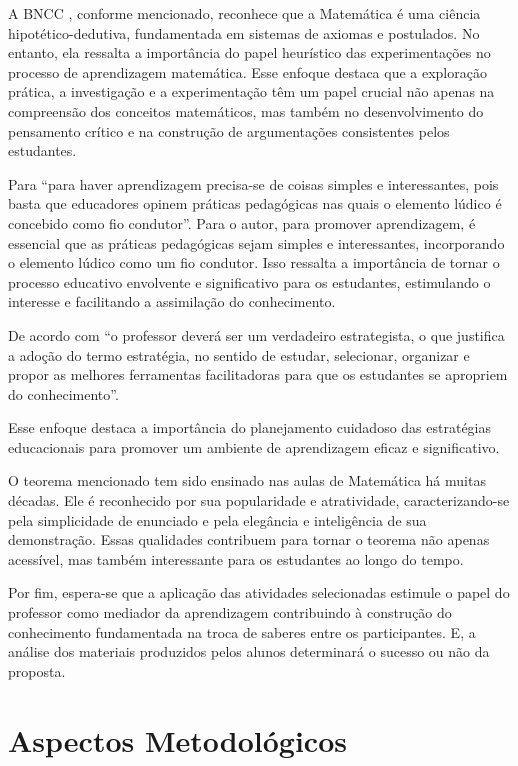 A BNCC \cite{Educacao2018}, conforme mencionado, reconhece que a Matemática é uma ciência hipotético-dedutiva, fundamentada em sistemas de axiomas e postulados. No entanto, ela ressalta a importância do papel heurístico das experimentações no processo de aprendizagem matemática. Esse enfoque destaca que a exploração prática, a investigação e a experimentação têm um papel crucial não apenas na compreensão dos conceitos matemáticos, mas também no desenvolvimento do pensamento crítico e na construção de argumentações consistentes pelos estudantes.

Para  ``para haver aprendizagem precisa-se de coisas simples e interessantes, pois basta que educadores opinem práticas pedagógicas nas quais o elemento lúdico é concebido como fio condutor''. Para o autor, para promover aprendizagem, é essencial que as práticas pedagógicas sejam simples e interessantes, incorporando o elemento lúdico como um fio condutor. Isso ressalta a importância de tornar o processo educativo envolvente e significativo para os estudantes, estimulando o interesse e facilitando a assimilação do conhecimento.

De acordo com  ``o professor deverá ser um verdadeiro estrategista, o que justifica a adoção do termo estratégia, no sentido de estudar, selecionar, organizar e propor as melhores ferramentas facilitadoras para que os estudantes se apropriem do conhecimento''.

Esse enfoque destaca a importância do planejamento cuidadoso das estratégias educacionais para promover um ambiente de aprendizagem eficaz e significativo.

O teorema mencionado tem sido ensinado nas aulas de Matemática há muitas décadas. Ele é reconhecido por sua popularidade e atratividade, caracterizando-se pela simplicidade de enunciado e pela elegância e inteligência de sua demonstração. Essas qualidades contribuem para tornar o teorema não apenas acessível, mas também interessante para os estudantes ao longo do tempo.

Por fim, espera-se que a aplicação das atividades selecionadas estimule o papel do professor como mediador da aprendizagem contribuindo à construção do conhecimento fundamentada na troca de saberes entre os participantes. E, a análise dos materiais produzidos pelos alunos determinará o sucesso ou não da proposta.

\chapter{Aspectos Metodológicos} \label{cap:3_aspectos}

